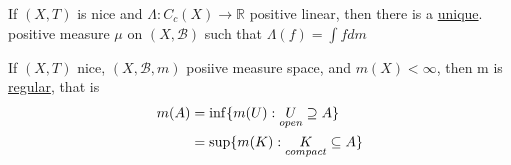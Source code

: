 \begin{theorem}
	If $(X,T)$ is nice and  $\Lambda : C_c (X) \to \mathbb{R}$ positive linear, then there is a \underline{unique}. positive measure $\mu$ on $(X,\mathcal{B})$ such that  $\Lambda(f) = \int f dm$
\end{theorem}

\begin{lemma}
	If $(X,T)$ nice,  $(X, \mathcal{B}, m)$ posiive measure space, and $m(X) < \infty$, then m is \underline{regular}, that is
	\begin{align}
		m(A) &= \inf\{m(U) : \underset{open}{U} \supseteq A\} \\
			 &= \sup\{m(K) : \underset{compact}{K} \subseteq A\}
	\end{align} 
\end{lemma}

